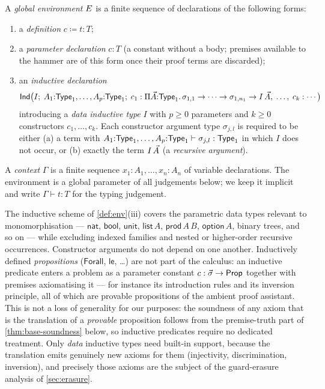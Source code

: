 \begin{definition}[Environments]
\label{def:env}
A \emph{global environment} $E$ is a finite sequence of
declarations of the following forms:
\begin{enumerate}[label=(\roman*)]
\item a \emph{definition} $c \coloneqq t : T$;
\item a \emph{parameter declaration} $c : T$ (a constant without a body;
  premises available to the hammer are of this form once their proof
  terms are discarded);
\item an \emph{inductive declaration}
  \[
    \mathsf{Ind}\bigl(I;\; A_1{:}\mathsf{Type}_1, \ldots, A_p{:}\mathsf{Type}_1;\;
        c_1 : \Pi\vec{A}{:}\mathsf{Type}_1.\,\sigma_{1,1} \to \cdots \to \sigma_{1,n_1} \to I\,\vec{A},\;
        \ldots,\;
        c_k : \cdots\bigr)
  \]
  introducing a \emph{data inductive type} $I$ with $p \geq 0$
  parameters and $k \geq 0$ constructors $c_1, \ldots, c_k$.  Each
  constructor argument type $\sigma_{j,l}$ is required to be either
  (a) a term with $A_1{:}\mathsf{Type}_1, \ldots, A_p{:}\mathsf{Type}_1 \vdash
  \sigma_{j,l} : \mathsf{Type}_1$ in which $I$ does not occur, or (b) exactly
  the term $I\,\vec{A}$ (a \emph{recursive argument}).
\end{enumerate}
A \emph{context} $\Gamma$ is a finite sequence $x_1{:}A_1, \ldots,
x_n{:}A_n$ of variable declarations.  The environment is a global
parameter of all judgements below; we keep it implicit and write
$\Gamma \vdash t : T$ for the typing judgement.
\end{definition}

The inductive scheme of \cref{def:env}(iii) covers the parametric
data types relevant to monomorphisation --- $\mathsf{nat}$,
$\mathsf{bool}$, $\mathsf{unit}$, $\mathsf{list}\,A$,
$\mathsf{prod}\,A\,B$, $\mathsf{option}\,A$, binary trees, and so on
--- while excluding indexed families and nested or higher-order
recursive occurrences.  Constructor arguments do not depend on one
another.  Inductively defined \emph{propositions}
($\mathsf{Forall}$, $\mathsf{le}$, \ldots) are not part of the
calculus: an inductive predicate enters a problem as a parameter
constant $c : \vec{\sigma} \to \mathsf{Prop}$ together with premises
axiomatising it --- for instance its introduction rules and its
inversion principle, all of which are provable propositions of the
ambient proof assistant.  This is not a loss of generality for our
purposes: the soundness of any axiom that is the translation of a
\emph{provable} proposition follows from the premise-truth part of
\cref{thm:base-soundness} below, so inductive predicates require no
dedicated treatment.  Only \emph{data} inductive types need built-in
support, because the translation emits genuinely new axioms for them
(injectivity, discrimination, inversion), and precisely those axioms
are the subject of the guard-erasure analysis of
\cref{sec:erasure}.

